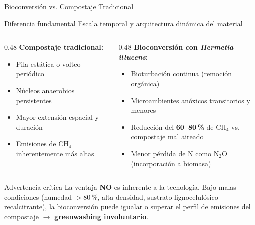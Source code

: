 \documentclass[aspectratio=169, 11pt]{beamer}
\newcommand{\BSF}{\textit{Hermetia illucens}}
\begin{document}
\begin{frame}{Bioconversión vs. Compostaje Tradicional}
\begin{block}{Diferencia fundamental}
Escala temporal y arquitectura dinámica del material
\end{block}
\vspace{0.2cm}
\begin{columns}[T]
\begin{column}{0.48\textwidth}
\textbf{Compostaje tradicional:}
\begin{itemize}
    \item Pila estática o volteo periódico
    \item Núcleos anaerobios persistentes
    \item Mayor extensión espacial y duración
    \item Emisiones de CH$_4$ inherentemente más altas
\end{itemize}
\end{column}
\begin{column}{0.48\textwidth}
\textbf{Bioconversión con \BSF:}
\begin{itemize}
    \item Bioturbación continua (remoción orgánica)
    \item Microambientes anóxicos transitorios y menores
    \item Reducción del \textbf{60--80\,\%} de CH$_4$ vs. compostaje mal aireado
    \item Menor pérdida de N como N$_2$O (incorporación a biomasa)
\end{itemize}
\end{column}
\end{columns}
\vfill
\begin{alertblock}{Advertencia crítica}
La ventaja \textbf{NO} es inherente a la tecnología. Bajo malas condiciones (humedad $>$80\,\%, alta densidad, sustrato lignocelulósico recalcitrante), la bioconversión puede igualar o superar el perfil de emisiones del compostaje $\rightarrow$ \textbf{greenwashing involuntario}.
\end{alertblock}
\end{frame}
\end{document}
